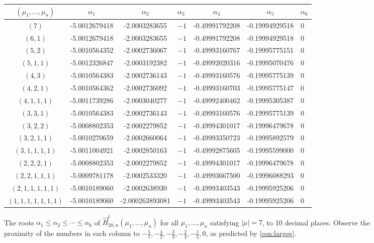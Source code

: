 \documentclass[a4paper]{article}
\theoremstyle{plain}
\numberwithin{theorem}{section}
\theoremstyle{definition}
\theoremstyle{remark}
\renewcommand{\leq}{\leqslant}
\newcommand{\HN}[3]{\vec{H}^t_{#1,#2}(#3)}
\begin{document}
\begin{figure} [ht!]
\begin{tabularx}{\textwidth}{cccYccY} \toprule
$(\mu_1, \ldots, \mu_n)$ & $\alpha_1$ & $\alpha_2$ & $\alpha_3$ & $\alpha_4$ & $\alpha_5$ & $\alpha_6$ \\ \midrule
$(7)$ & -5.0012679418 & -2.0003283655 & $-1$ & -0.49991792208 & -0.19994929518 & $0$ \\
$(6, 1)$ & -5.0012679418 & -2.0003283655 & $-1$ & -0.49991792208 & -0.19994929518 & $0$ \\
$(5, 2)$ & -5.0010564352 & -2.0002736067 & $-1$ & -0.49993160767 & -0.19995775151 & $0$ \\
$(5, 1, 1)$ & -5.0012326847 & -2.0003192382 & $-1$ & -0.49992020316 & -0.19995070476 & $0$ \\
$(4, 3)$ & -5.0010564383 & -2.0002736143 & $-1$ & -0.49993160576 & -0.19995775139 & $0$ \\
$(4, 2, 1)$ & -5.0010564362 & -2.0002736092 & $-1$ & -0.49993160703 & -0.19995775147 & $0$ \\
$(4, 1, 1, 1)$ & -5.0011739286 & -2.0003040277 & $-1$ & -0.49992400462 & -0.19995305387 & $0$ \\
$(3, 3, 1)$ & -5.0010564383 & -2.0002736143 & $-1$ & -0.49993160576 & -0.19995775139 & $0$ \\
$(3, 2, 2)$ & -5.0008802353 & -2.0002279852 & $-1$ & -0.49994301017 & -0.19996479678 & $0$ \\
$(3, 2, 1, 1)$ & -5.0010270659 & -2.0002660064 & $-1$ & -0.49993350723 & -0.19995892579 & $0$ \\
$(3, 1, 1, 1, 1)$ & -5.0011004921 & -2.0002850163 & $-1$ & -0.49992875605 & -0.19995599000 & $0$ \\
$(2, 2, 2, 1)$ & -5.0008802353 & -2.0002279852 & $-1$ & -0.49994301017 & -0.19996479678 & $0$ \\
$(2, 2, 1, 1, 1)$ & -5.0009781178 & -2.0002533320 & $-1$ & -0.49993667500 & -0.19996088293 & $0$ \\
$(2, 1, 1, 1, 1, 1)$ & -5.0010189060 & -2.0002638930 & $-1$ & -0.49993403543 & -0.19995925206 & $0$ \\
$(1, 1, 1, 1, 1, 1, 1)$ & -5.0010189060 & -2.000263893081 & $-1$ & -0.49993403543 & -0.19995925206 & $0$ \\ \bottomrule
\end{tabularx}
\caption{The roots $\alpha_1 \leq \alpha_2 \leq \cdots \leq \alpha_6$ of $\HN{20}{n}{\mu_1, \ldots, \mu_n}$ for all $\mu_1, \ldots, \mu_n$ satisfying $|\mu| = 7$, to 10 decimal places. Observe the proximity of the numbers in each column to $-\frac{5}{1}, -\frac{4}{2}, -\frac{3}{3}, -\frac{2}{4}, -\frac{1}{5}, 0$, as predicted by \cref{con:largeg}.}
\label{table:gincreasing1}
\end{figure}
\end{document}
